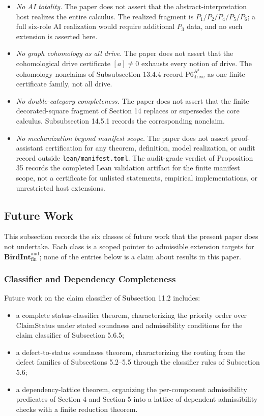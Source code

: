 \documentclass[11pt]{article}
\providecommand{\tightlist}{}
\theoremstyle{definition}
\begin{document}
\begin{itemize}
\item
  \emph{No AI totality.} The paper does not assert that the abstract-interpretation host realizes the entire calculus. The realized fragment is \(P_{1}/P_{2}/P_{4}/P_{5}/P_{6}\); a full six-role AI realization would require additional \(P_{3}\) data, and no such extension is asserted here.
\item
  \emph{No graph cohomology as all drive.} The paper does not assert that the cohomological drive certificate \([a]\neq 0\) exhausts every notion of drive. The cohomology nonclaims of Subsubsection 13.4.4 record \(\mathrm{P6}_{\mathrm{drive}}^{H^1}\) as one finite certificate family, not all drive.
\item
  \emph{No double-category completeness.} The paper does not assert that the finite decorated-square fragment of Section 14 replaces or supersedes the core calculus. Subsubsection 14.5.1 records the corresponding nonclaim.
\item
  \emph{No mechanization beyond manifest scope.} The paper does not assert proof-assistant certification for any theorem, definition, model realization, or audit record outside \texttt{lean/manifest.toml}. The audit-grade verdict of Proposition 35 records the completed Lean validation artifact for the finite manifest scope, not a certificate for unlisted statements, empirical implementations, or unrestricted host extensions.
\end{itemize}

\subsection{Future Work}

This subsection records the six classes of future work that the present paper does not undertake. Each class is a scoped pointer to admissible extension targets for \(\mathbf{BirdInt}^{\mathrm{aud}}_{\mathrm{fin}}\); none of the entries below is a claim about results in this paper.

\subsubsection{Classifier and Dependency Completeness}

Future work on the claim classifier of Subsection 11.2 includes:

\begin{itemize}
\tightlist
\item
  a complete status-classifier theorem, characterizing the priority order over \(\mathrm{ClaimStatus}\) under stated soundness and admissibility conditions for the claim classifier of Subsection 5.6.5;
\item
  a defect-to-status soundness theorem, characterizing the routing from the defect families of Subsections 5.2--5.5 through the classifier rules of Subsection 5.6;
\item
  a dependency-lattice theorem, organizing the per-component admissibility predicates of Section 4 and Section 5 into a lattice of dependent admissibility checks with a finite reduction theorem.
\end{itemize}
\end{document}
